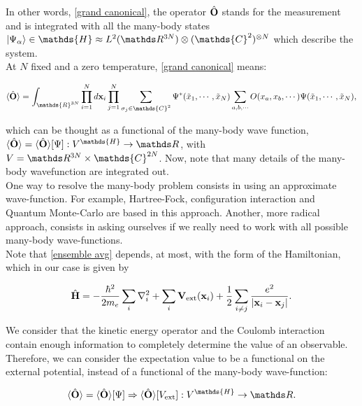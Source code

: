 \documentclass{homework}
\begin{document}
In other words, \eqref{grand canonical}, the operator $\hat{\bf O}$ stands for the measurement and is integrated with all the many-body states $\ket{\Psi_\alpha} \in \mathds{H} \approx L^2(\R^{3N}) \otimes (\mathds{C}^{2})^{\otimes N}$ which describe the system. \\

At $N$ fixed and a zero temperature, \eqref{grand canonical} means:

\begin{equation}
     \langle \hat{\bf O} \rangle = \int_{\mathds{R}^{3N}} \prod_{i=1}^N d{\bf x}_i \prod_{j=1}^{N} \sum_{\sigma_j \in \mathds{C}^2} \Psi^{*}(\tilde{x}_1, \cdots, \tilde{x}_N) \sum_{a,b,\cdots} O(x_a, x_b, \cdots) \Psi(\tilde{x}_1, \cdots, \tilde{x}_N),
\label{ensemble avg}
\end{equation}

which can be thought as a functional of the many-body wave function, $\langle \hat{\bf O} \rangle = \langle \hat{\bf O} \rangle[\Psi]: {V}^{\mathds{H}} \rightarrow \R$, with $V = \R^{3N} \times \mathds {C}^{2N}$. Now, note that many details of the many-body wavefunction are integrated out. \\

One way to resolve the many-body problem consists in using an approximate wave-function. For example, Hartree-Fock, configuration interaction and Quantum Monte-Carlo are based in this approach. Another, more radical approach, consists in asking ourselves if we really need to work with all possible many-body wave-functions. \\

Note that \eqref{ensemble avg} depends, at most, with the form of the Hamiltonian, which in our case is given by 
 
\begin{equation}
    \hat{\bf H} = -\frac{\hbar^2}{2m_e} \sum_i \nabla^2_i + \sum_{i} {\bf V}_{\textnormal{ext}} ({\bf x}_i) + \frac{1}{2} \sum_{i \neq j} \frac{e^2}{|{\bf x}_i-{\bf x}_j|}.
\label{hamiltonian 3}
\end{equation}

We consider that the kinetic energy operator and the Coulomb interaction contain enough information to completely determine the value of an observable. Therefore, we can consider the expectation value to be a functional on the external potential, instead of a functional of the many-body wave-function:

$$
\langle \hat{\bf O} \rangle = \langle \hat{\bf O}  \rangle[\Psi] \Rightarrow
\langle \hat{\bf O}  \rangle[V_{\textnormal{ext}}]
: {V}^{\mathds{H}} \rightarrow \R.
$$
\end{document}
